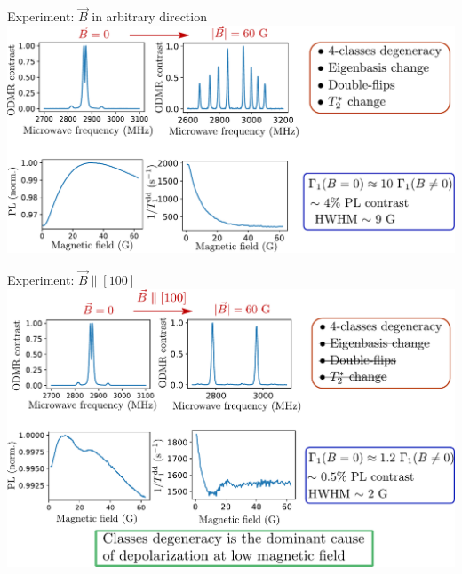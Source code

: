 \documentclass{beamer}
\begin{document}

\begin{frame}{Experiment: $\vec B$ in arbitrary direction}
\centering
\includegraphics[width=\textwidth,height=0.85\textheight,keepaspectratio]{Slide_T1_PL_1x1x1x1}
\end{frame}

\begin{frame}{Experiment: $\vec B \parallel [100]$}
\centering
\includegraphics[width=\textwidth,height=0.85\textheight,keepaspectratio]{Slide_T1_PL_100}
\end{frame}
\end{document}
